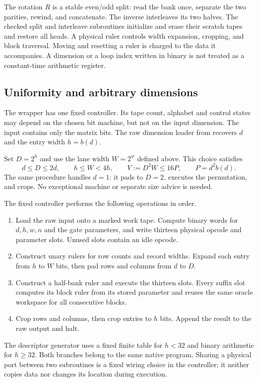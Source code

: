 The rotation $R$ is a stable even/odd split: read the bank once, separate
the two parities, rewind, and concatenate. The inverse interleaves its two
halves. The checked split and interleave subroutines initialize and erase their
scratch tapes and restore all heads. A physical ruler controls width
expansion, cropping, and block traversal. Moving and resetting a ruler is
charged to the data it accompanies. A dimension or a loop index written in
binary is not treated as a constant-time arithmetic register.

\subsection{Uniformity and arbitrary dimensions}
The wrapper has one fixed controller. Its tape count, alphabet and control
states may depend on the chosen bit machine, but not on the input dimension.
The input contains only the matrix bits. The raw dimension loader from
\cite{SecondPaper2026} recovers $d$ and the entry width $h=b(d)$.

Set $D=2^h$ and use the lane width $W=2^{w}$ defined above. This choice
satisfies
\[
 d\leq D\leq2d,\qquad h\leq W<4h,\qquad
 V:=D^2W\leq16P,\qquad P=d^2b(d).
\]
The same procedure handles $d=1$: it pads to $D=2$, executes the
permutation, and crops. No exceptional machine or separate size advice is
needed.

The fixed controller performs the following operations in order.
\begin{enumerate}[nosep]
\item Load the raw input onto a marked work tape. Compute binary words for
$d,h,w,n$ and the gate parameters, and write thirteen physical opcode and
parameter slots. Unused slots contain an idle opcode.
\item Construct unary rulers for row counts and record widths. Expand each
entry from $h$ to $W$ bits, then pad rows and columns from $d$ to $D$.
\item Construct a half-bank ruler and execute the thirteen slots. Every
suffix slot computes its block ruler from its stored parameter and reuses
the same oracle workspace for all consecutive blocks.
\item Crop rows and columns, then crop entries to $h$ bits. Append the
result to the raw output and halt.
\end{enumerate}
The descriptor generator uses a fixed finite table for $h<32$ and binary
arithmetic for $h\geq32$. Both branches belong to the same native program.
Sharing a physical port between two subroutines is a fixed wiring choice in the controller; it neither copies
data nor changes its location during execution.

